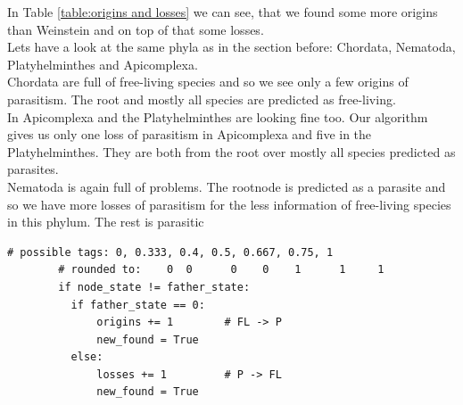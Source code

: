       In Table \ref{table:origins and losses} we can see, that we found some more origins than Weinstein 
        and on top of that some losses. \\
      
      Lets have a look at the same phyla as in the section before: Chordata, Nematoda, 
        Platyhelminthes and Apicomplexa. \\
      Chordata are full of free-living species and so we see only a few origins of parasitism. The root
      and mostly all species are predicted as free-living. \\
      In Apicomplexa and the Platyhelminthes are looking fine too. Our algorithm gives us only one loss 
        of parasitism in Apicomplexa and five in the Platyhelminthes. They are both from the root over 
        mostly all species predicted as parasites. \\
      Nematoda is again full of problems. The rootnode is predicted as a parasite and so we have more 
        losses of parasitism for the less information of free-living species in this phylum. The rest 
        is parasitic \\

      \begin{lstlisting}[gobble=6]
        # possible tags: 0, 0.333, 0.4, 0.5, 0.667, 0.75, 1
        # rounded to:    0  0      0    0    1      1     1
        if node_state != father_state:
          if father_state == 0:
              origins += 1        # FL -> P
              new_found = True
          else:
              losses += 1         # P -> FL
              new_found = True
      \end{lstlisting}

      
